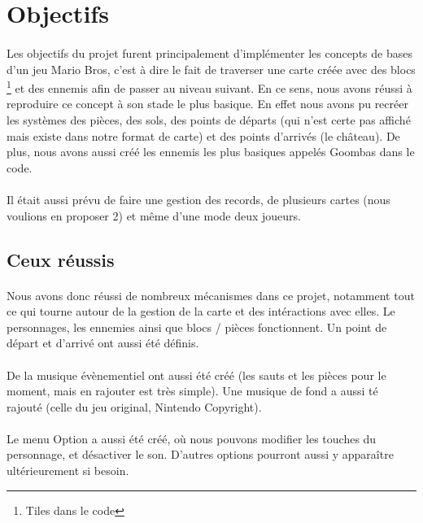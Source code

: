 ﻿\section{Objectifs}

\paragraph{} Les objectifs du projet furent principalement d'implémenter les concepts de bases d'un jeu Mario Bros, c'est à dire le fait de traverser une carte créée avec des blocs \footnote{Tiles dans le code} et des ennemis afin de passer au niveau suivant. En ce sens, nous avons réussi à reproduire ce concept à son stade le plus basique. En effet nous avons pu recréer les systèmes des pièces, des sols, des points de départs (qui n'est certe pas affiché mais existe dans notre format de carte) et des points d'arrivés (le château). De plus, nous avons aussi créé les ennemis les plus basiques appelés Goombas dans le code.

\paragraph{} Il était aussi prévu de faire une gestion des records, de plusieurs cartes (nous voulions en proposer 2) et même d'une mode deux joueurs.

\subsection{Ceux réussis}

\paragraph{} Nous avons donc réussi de nombreux mécanismes dans ce projet, notamment tout ce qui tourne autour de la gestion de la carte et des intéractions avec elles. Le personnages, les ennemies ainsi que blocs / pièces fonctionnent. Un point de départ et d'arrivé ont aussi été définis.
\paragraph{} De la musique évènementiel ont aussi été créé (les sauts et les pièces pour le moment, mais en rajouter est très simple). Une musique de fond a aussi té rajouté (celle du jeu original, Nintendo Copyright).
\paragraph{} Le menu Option a aussi été créé, où nous pouvons modifier les touches du personnage, et désactiver le son. D'autres options pourront aussi y apparaître ultérieurement si besoin.

